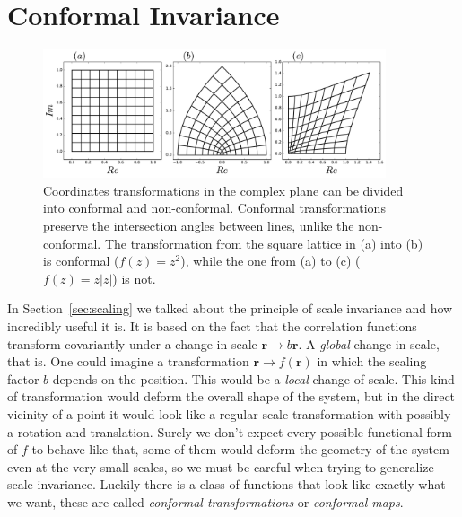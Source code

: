 \section{Conformal Invariance}
\label{ch:conf}

\begin{figure}[b]
\begin{center}
    \includegraphics[width=0.9\textwidth]{chapters/ch3-conf/figs/cmapex}
\end{center}
\caption{Coordinates transformations in the complex plane can be divided into
    conformal and non-conformal. Conformal transformations preserve the
    intersection angles between lines, unlike the non-conformal. The
    transformation from the square lattice in (a) into (b) is conformal
    ($f(z)=z^2$), while the one from (a) to (c) ($f(z)=z|z|$) is not.}
\label{fig:cmapex}
\end{figure}

In Section~\ref{sec:scaling} we talked about the principle of scale invariance
and how incredibly useful it is. It is based on the fact that the correlation
functions transform covariantly under a change in scale $\mathbf{r}\rightarrow
b\mathbf{r}$. A \textit{global} change in scale, that is. One could imagine a
transformation $\mathbf{r}\rightarrow f(\mathbf{r})$ in which the scaling
factor $b$ depends on the position. This would be a \textit{local} change of
scale. This kind of transformation would deform the overall shape of the
system, but in the direct vicinity of a point it would look like a regular
scale transformation with possibly a rotation and translation. Surely we don't
expect every possible functional form of $f$ to behave like that, some of them would
deform the geometry of the system even at the very small scales, so we must be
careful when trying to generalize scale invariance. Luckily there is a class of
functions that look like exactly what we want, these are called
\textit{conformal transformations} or \textit{conformal maps}.

